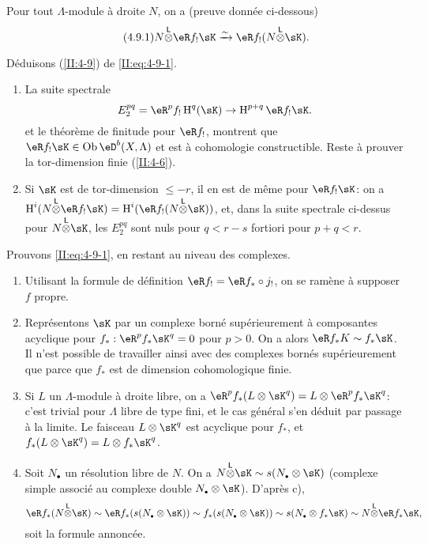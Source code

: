 Pour tout $\Lambda$-module à droite $N$, on a (preuve donnée ci-dessous) 
\begin{equation*}\tag{4.9.1}\label{II:eq:4-9-1}
  N\lotimes \eR f_! \sK \iso \eR f_! (N\lotimes \sK) \text{.}
\end{equation*}

Déduisons (\ref{II:4-9}) de \eqref{II:eq:4-9-1}. 
\begin{enumerate}[\indent a)]
  \item La suite spectrale 
    \[
      E_2^{p q} = \eR^p f_! \h^q(\sK) \rightarrow \h^{p+q} \eR f_! \sK \text{.}
    \]
    et le théorème de finitude pour $\eR f_!$, montrent que 
    $\eR f_!\sK\in \ob \eD^b(X,\Lambda)$ et est à cohomologie constructible. 
    Reste à prouver la tor-dimension finie (\ref{II:4-6}). 
  \item Si $\sK$ est de tor-dimension $\leqslant -r$, il en est de même pour 
    $\eR f_! \sK$: on a $\h^i(N\lotimes \eR f_! \sK) = \h^i(\eR f_!(N\lotimes \sK))$, 
    et, dans la suite spectrale ci-dessus pour $N\lotimes \sK$, les 
    $E_2^{p q}$ sont nuls pour $q<r-s$ fortiori pour $p+q<r$. 
\end{enumerate}

Prouvons \eqref{II:eq:4-9-1}, en restant au niveau des complexes. 
\begin{enumerate}[\indent a)]
  \item Utilisant la formule de définition $\eR f_! = \eR f_*\circ j_!$, on se 
    ramène à supposer $f$ propre. 
  \item Représentons $\sK$ par un complexe borné 
    supérieurement à composantes acyclique pour $f_*:\eR^p f_* \sK^q = 0$ 
    pour $p>0$. On a alors $\eR f_* K \sim f_* \sK$. Il n'est possible de 
    travailler ainsi avec des complexes bornés supérieurement que parce que 
    $f_*$ est de dimension cohomologique finie. 
  \item Si $L$ un $\Lambda$-module à droite libre, on a 
    $\eR^p f_*(L\otimes \sK^q) = L\otimes \eR^p f_* \sK^q$: c'est trivial pour 
    $\Lambda$ libre de type fini, et le cas général s'en déduit par 
    passage à la limite. Le faisceau $L\otimes \sK^q$ est acyclique pour 
    $f_*$, et $f_*(L\otimes \sK^q) = L\otimes f_* \sK^q$. 
  \item Soit $N_\bullet$ un résolution libre de $N$. On a 
    $N\lotimes \sK\sim s(N_\bullet\otimes \sK)$ (complexe simple associé au 
    complexe double $N_\bullet\otimes \sK$). D'après c), 
    \[
      \eR f_*(N\lotimes \sK) \sim \eR f_* (s(N_\bullet\otimes \sK)) \sim f_*(s(N_\bullet\otimes \sK)) \sim s(N_\bullet\otimes f_* \sK) \sim N\lotimes \eR f_* \sK \text{,}
    \]
    soit la formule annoncée. 
\end{enumerate}

